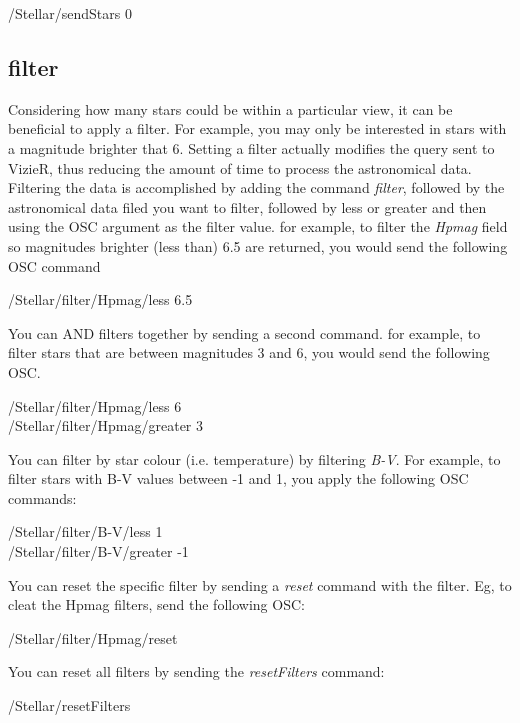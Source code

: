  \begin{syntax}	
	\medskip
	/Stellar/sendStars 0
	\medskip
\end{syntax}  

\subsection{filter}   
Considering how many stars could be within a particular view, it can be beneficial to apply a filter.  For example, you may only be interested in stars with a magnitude brighter that 6. Setting a filter actually modifies the query sent to VizieR, thus reducing the amount of time to process the astronomical data.
Filtering the data is accomplished by adding the command \textit{filter}, followed by the astronomical data filed you want to filter, followed by less or greater and then using the OSC argument as the filter value.  for example, to filter the \textit{Hpmag} field so magnitudes brighter (less than) 6.5 are returned, you would send the following OSC command
   
    \begin{syntax}	   
   	\medskip
   	/Stellar/filter/Hpmag/less 6.5
   	\medskip
   \end{syntax}  

You can AND filters together by sending a second command. for example, to filter stars that are between magnitudes 3 and 6, you would send the following OSC.
    \begin{syntax}	 
	\medskip
	/Stellar/filter/Hpmag/less 6\\
	/Stellar/filter/Hpmag/greater 3
	\medskip
\end{syntax}  

You can filter by star colour (i.e. temperature) by filtering \textit{B-V}. For example, to filter stars with  B-V values between -1 and 1, you apply the following OSC commands:  
     \begin{syntax}	   
 	\medskip
 	/Stellar/filter/B-V/less 1\\
 	/Stellar/filter/B-V/greater -1
 	\medskip
\end{syntax}  

You can reset the specific filter by sending a \textit{reset} command with the filter. Eg, to cleat the Hpmag filters, send the following OSC:  
    \begin{syntax}	
	\medskip
	/Stellar/filter/Hpmag/reset
	\medskip
\end{syntax}  


You can reset all filters by sending the \textit{resetFilters} command: 
\begin{syntax}	
	\medskip
	/Stellar/resetFilters
	\medskip
\end{syntax}  
